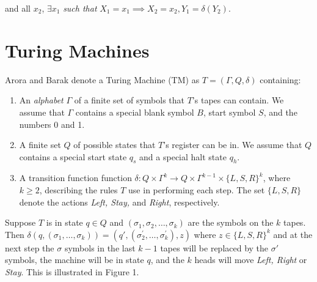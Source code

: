 \documentclass[11pt]{article}
\begin{document}
\quad and all $ x_2 $, $ \exists x_1 $ \textit{ such that } $ X_1 = x_1 \implies X_2 = x_2, Y_1 = \delta(Y_2) $. \\

\newpage
\section{Turing Machines} 


 Arora and Barak denote a Turing Machine (TM) as $ T = (\Gamma, Q, \delta) $ containing:
\begin{enumerate}
\item An \textit{alphabet} $ \Gamma $ of a finite set of symbols that $ T $'s tapes can contain. We assume that $ \Gamma $ contains a special blank symbol $ B $, start symbol $ S $, and the numbers 0 and 1. 
\item A finite set $ Q $ of possible states that $ T $'s register can be in. We assume that $ Q $ contains a special start state $ q_{s} $ and a special halt state $ q_{h} $. 
\item A transition function function $ \delta : Q \times \Gamma^{k} \rightarrow Q \times \Gamma^{k - 1} \times \{L, S, R\}^{k} $, where $ k \geq 2$, describing the rules $ T $ use in performing each step. The set $\{L ,S, R\}$ denote the actions \textit{Left, Stay,} and \textit{Right}, respectively. 
\end{enumerate}

Suppose $ T $ is in state $ q \in Q $ and $ (\sigma_1, \sigma_2, \dots, \sigma_k) $ are the symbols on the $ k $ tapes. Then $ \delta(q, (\sigma_1, \dots, \sigma_k)) = (q', (\sigma_{2}^{'}, \dots, \sigma_{k}^{'}), z) $ where $ z \in \{L, S, R\}^k $ and at the next step the $ \sigma $ symbols in the last $ k - 1 $ tapes will be replaced by the $ \sigma' $ symbols, the machine will be in state $ q $, and the $ k $ heads will move \textit{Left, Right} or \textit{Stay}. This is illustrated in Figure 1. \\
\end{document}

